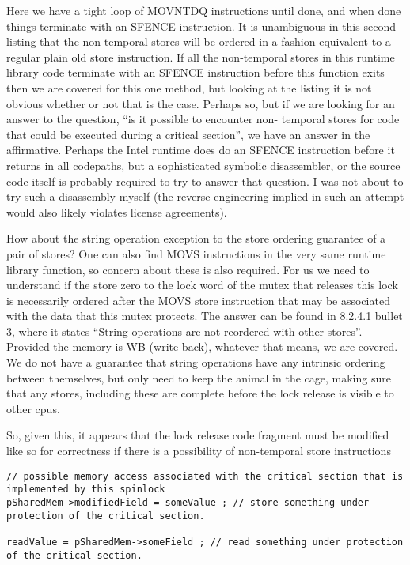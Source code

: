 {{Here we have a tight loop of MOVNTDQ instructions until done, and when done things terminate with an SFENCE instruction.  It is unambiguous in this second listing that the non-temporal stores will be ordered in a fashion equivalent to a regular plain old store instruction.  If all the non-temporal stores in this runtime library code terminate with an SFENCE instruction before this function exits then we are covered for this one method, but looking at the listing it is not obvious whether or not that is the case.  Perhaps so, but if we are looking for an answer to the question, ``is it possible to encounter non- temporal stores for code that could be executed during a critical section'', we have an answer in the affirmative.  Perhaps the Intel runtime does do an SFENCE instruction before it returns in all codepaths, but a sophisticated symbolic disassembler, or the source code itself is probably required to try to answer that question.  I was not about to try such a disassembly myself (the reverse engineering implied in such an attempt would also likely violates license agreements).

How about the string operation exception to the store ordering guarantee of a pair of stores?  One can also find MOVS instructions in the very same runtime library function, so concern about these is also required.  For us we need to understand if the store zero to the lock word of the mutex that releases this lock is necessarily ordered after the MOVS store instruction that may be associated with the data that this mutex protects.  The answer can be found in 8.2.4.1 bullet 3, where it states ``String operations are not reordered with other stores''.  Provided the memory is WB (write back), whatever that means, we are covered.  We do not have a guarantee that string operations have any intrinsic ordering between themselves, but only need to keep the animal in the cage, making sure that any stores, including these are complete before the lock release is visible to other cpus. 

So, given this, it appears that the lock release code fragment must be modified like so for correctness if there is a possibility of non-temporal store instructions

\begin{lstlisting}
// possible memory access associated with the critical section that is implemented by this spinlock
pSharedMem->modifiedField = someValue ; // store something under protection of the critical section.

readValue = pSharedMem->someField ; // read something under protection of the critical section.


\end{lstlisting}}}
